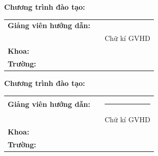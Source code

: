 \newcommand{\unitrackcoverpage}[1]{%
\begin{titlepage}
  \centering
  {\bfseries\Large \UniversityName\par}

  \vspace{3.5cm}

  {\bfseries\Huge \ReportType\par}

  \vspace{1.2cm}

  {\bfseries\Large \ReportTitle\par}

  \vspace{1.2cm}

  {\bfseries\large \StudentNameCover\par}
  {\large \StudentEmail\par}

  \vspace{0.8cm}
  {\bfseries\large Chương trình đào tạo: \TrainingProgram\par}

  \vspace{2.4cm}

  \begin{tabularx}{\textwidth}{>{\bfseries}l X r}
    Giảng viên hướng dẫn: & \SupervisorName & #1 \\
    & & \if\relax\detokenize{#1}\relax\else Chữ kí GVHD\fi \\
    [1em]
    Khoa: & \FacultyName & \\
    [1em]
    Trường: & \SchoolName & \\
  \end{tabularx}

  \vfill
  {\bfseries\large \ReportLocationDate\par}
\end{titlepage}%
}

\unitrackcoverpage{}
\unitrackcoverpage{\rule{3.2cm}{0.4pt}}
